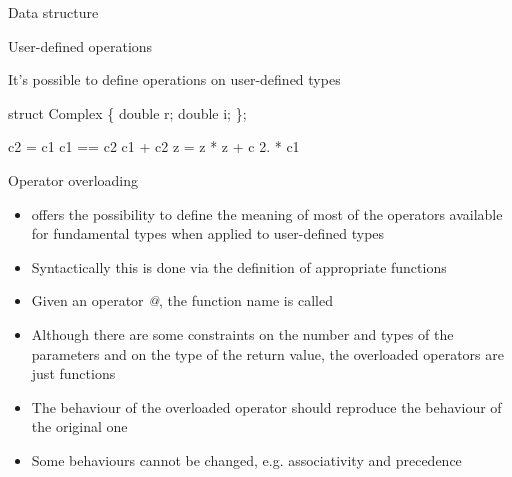 \begin{frame}[fragile]{Data structure}
  \vskip -0.3cm


\end{frame}

\begin{frame}[fragile]{User-defined operations}

  It's possible to define operations on user-defined types

  \begin{codeblock}
struct Complex \{
  double r;
  double i;
\};



c2 \alert<2>{=} c1
c1 \alert<3-4>{==} c2
c1 \alert<5-6>{+} c2
z = z * z + c
2. * c1
\ddd\end{codeblock}


\end{frame}

\begin{frame}[fragile]{Operator overloading}


  \begin{itemize}[<+->]
  \item \Cpp{} offers the possibility to define the meaning of most of the
    operators available for fundamental types when applied to user-defined types
  \item Syntactically this is done via the definition of appropriate functions
  \item Given an operator \textit{@}, the function name is called
  \item Although there are some constraints on the number and types of the
    parameters and on the type of the return value, the overloaded operators
    are just functions
  \item The behaviour of the overloaded operator should reproduce the behaviour
    of the original one
  \item Some behaviours cannot be changed, e.g. associativity and precedence
  \end{itemize}

\end{frame}

